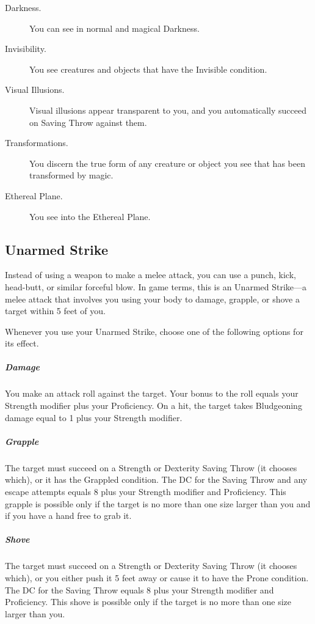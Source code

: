 \documentclass[10pt,a4paper,twoside,bg=print,twocolumn,openany,nodeprecatedcode]{dndarticle}
\begin{document}
\begin{description}
\item[Darkness.]
You can see in normal and magical Darkness.

\item[Invisibility.]
You see creatures and objects that have the Invisible condition.

\item[Visual Illusions.]
Visual illusions appear transparent to you, and you automatically succeed on Saving Throw against them.

\item[Transformations.]
You discern the true form of any creature or object you see that has been transformed by magic.

\item[Ethereal Plane.]
You see into the Ethereal Plane.

\end{description}

\subsection{Unarmed Strike}
Instead of using a weapon to make a melee attack, you can use a punch, kick, head-butt, or similar forceful blow. In game terms, this is an Unarmed Strike—a melee attack that involves you using your body to damage, grapple, or shove a target within 5 feet of you.

Whenever you use your Unarmed Strike, choose one of the following options for its effect.

\subparagraph{Damage}
You make an attack roll against the target. Your bonus to the roll equals your Strength modifier plus your Proficiency. On a hit, the target takes Bludgeoning damage equal to 1 plus your Strength modifier.

\subparagraph{Grapple}
The target must succeed on a Strength or Dexterity Saving Throw (it chooses which), or it has the Grappled condition. The DC for the Saving Throw and any escape attempts equals 8 plus your Strength modifier and Proficiency. This grapple is possible only if the target is no more than one size larger than you and if you have a hand free to grab it.

\subparagraph{Shove}
The target must succeed on a Strength or Dexterity Saving Throw (it chooses which), or you either push it 5 feet away or cause it to have the Prone condition. The DC for the Saving Throw equals 8 plus your Strength modifier and Proficiency. This shove is possible only if the target is no more than one size larger than you.
\end{document}
